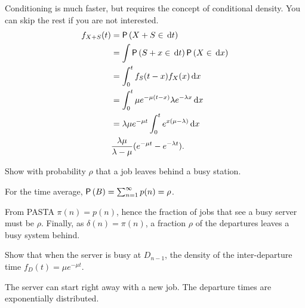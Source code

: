 \begin{exercise}
\begin{solution}
Conditioning is much faster, but requires the concept of conditional density. You can skip the rest if you are not interested. 
    \begin{align*}
    f_{X+S}(t) 
&= \P{X+S\in \d{t}} \\
&= \int \P{S+x\in \d{t}}\P{X\in \d{x}} \\
&=\int_0^t f_S(t-x) f_X(x) \d{x} \\
     &= \int_0^t \mu e^{-\mu(t-x)} \lambda e^{-\lambda x} \d{x} \\
     &= \lambda \mu e^{-\mu t} \int_0^t  e^{x(\mu-\lambda)} \d{x} \\
& \frac{\lambda \mu}{\lambda - \mu} (e^{-\mu t} - e^{-\lambda t}).
    \end{align*}
    \end{solution}
\end{exercise}

\begin{exercise}
Show with  probability $\rho$ that a job leaves behind a busy station.
    \begin{solution}
For the time average, 
        $\P B = \sum_{n=1}^\infty p(n) = \rho$.
    \end{solution}
From PASTA $\pi(n) = p(n)$, hence the fraction of jobs that see a busy server must be $\rho$. Finally, as $\delta(n) = \pi(n)$, a fraction $\rho$ of the departures leaves a busy system behind.
\end{exercise}

\begin{exercise}
Show  that when the server is busy at $D_{n-1}$, the density of the inter-departure time  $f_D(t) = \mu e^{-\mu t}$.
    \begin{solution}
The server can start right away with a new job. The departure times are exponentially distributed. 
    \end{solution}
\end{exercise}

